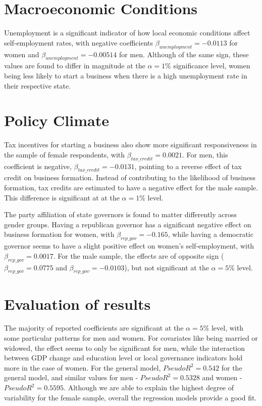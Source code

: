 \section{Macroeconomic Conditions}

Unemployment is a significant indicator of how local economic conditions affect self-employment rates, with negative coefficients $\beta_{unemployment} = -0.0113$ for women and $\beta_{unemployment} = -0.00514$ for men. Although of the same sign, these values are found to differ in magnitude at the $\alpha = 1\% $ significance level, women being less likely to start a business when there is a high unemployment rate in their respective state. 

\section{Policy Climate}
Tax incentives for starting a business also show more significant responsiveness in the sample of female respondents, with  $\beta_{tax\_credit} = 0.0021$. For men, this coefficient is negative, $\beta_{tax\_credit} = -0.0131$, pointing to a reverse effect of tax credit on business formation. Instead of contributing to the likelihood of business formation, tax credits are estimated to have a negative effect for the male sample. This difference is significant at at the $\alpha = 1\% $ level. 

The party affiliation of state governors is found to matter differently across gender groups. Having a republican governor has a significant negative effect on business formation for women, with $\beta_{rep\_gov} = -0.165$, while having a democratic governor seems to have a slight positive effect on women’s self-employment, with  $\beta_{rep\_gov} = 0.0017$. For the male sample, the effects are of opposite sign ($\beta_{rep\_gov} = 0.0775$ and $\beta_{rep\_gov} = -0.0103$), but not significant at the $\alpha = 5\% $ level. 

\section{Evaluation of results}

The majority of reported coefficients are significant at the $\alpha = 5\% $ level, with some particular patterns for men and women. For covariates like being married or widowed, the effect seems to only be significant for men, while the interaction between GDP change and education level or local governance indicators hold more in the case of women. For the general model, $PseudoR^2 = 0.542$ for the general model, and similar values for men - $PseudoR^2 = 0.5328$ and women - $PseudoR^2 = 0.5595$. Although we are able to explain the highest degree of variability for the female sample, overall the regression models provide a good fit.























